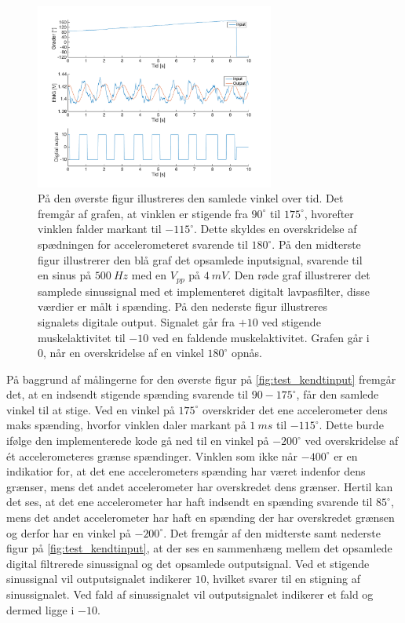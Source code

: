 \begin{figure}[H]
\centering
\includegraphics[width=0.7\textwidth]{figures/kontrol_test_sinus}
\caption{På den øverste figur illustreres den samlede vinkel over tid. Det fremgår af grafen, at vinklen er stigende fra $90^{\circ}$ til $175^{\circ}$, hvorefter vinklen falder markant til $-115^{\circ}$. Dette skyldes en overskridelse af spædningen for accelerometeret svarende til $180^{\circ}$.
På den midterste figur illustrerer den blå graf det opsamlede inputsignal, svarende til en sinus på $500~Hz$ med en $V_{pp}$ på $4~mV$. Den røde graf illustrerer det samplede sinussignal med et implementeret digitalt lavpasfilter, disse værdier er målt i spænding. 
På den nederste figur illustreres signalets digitale output. Signalet går fra $+10$ ved stigende muskelaktivitet til $-10$ ved en faldende muskelaktivitet. Grafen går i $0$, når en overskridelse af en vinkel $180^{\circ}$ opnås.}
\label{fig:test_kendtinput}
\end{figure}

På baggrund af målingerne for den øverste figur på \autoref{fig:test_kendtinput} fremgår det, at en indsendt stigende spænding svarende til $90-175^{\circ}$, får den samlede vinkel til at stige. Ved en vinkel på $175^{\circ}$ overskrider det ene accelerometer dens maks spænding, hvorfor vinklen daler markant på $1~ms$ til $-115^{\circ}$. Dette burde ifølge den implementerede kode gå ned til en vinkel på $-200^{\circ}$ ved overskridelse af ét accelerometeres grænse spændinger. 
Vinklen som ikke når $-400^{\circ}$ er en indikatior for, at det ene accelerometers spænding har været indenfor dens grænser, mens det andet accelerometer har overskredet dens grænser. Hertil kan det ses, at det ene accelerometer har haft indsendt en spænding svarende til $85^{\circ}$, mens det andet accelerometer har haft en spænding der har overskredet grænsen og derfor har en vinkel på $-200^{\circ}$.
Det fremgår af den midterste samt nederste figur på \autoref{fig:test_kendtinput}, at der ses en sammenhæng mellem det opsamlede digital filtrerede sinussignal og det opsamlede outputsignal. Ved et stigende sinussignal vil outputsignalet indikerer $10$, hvilket svarer til en stigning af sinussignalet. Ved fald af sinussignalet vil outputsignalet indikerer et fald og dermed ligge i $-10$.

